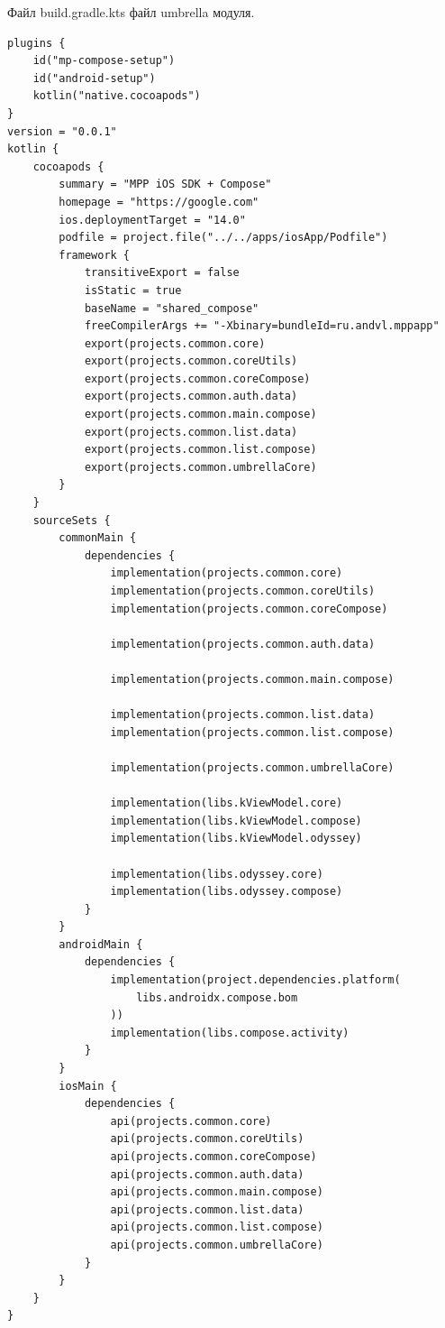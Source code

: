\documentclass[14pt, russian]{scrartcl}
\newenvironment{longlisting}{\captionsetup{type=listing}}{}
\begin{document}
\vspace{-20pt}

\begin{longlisting}
\caption{Файл build.gradle.kts файл umbrella модуля.}
\label{lst:umbrella-build-gradle}
\begin{verbatim}
plugins {
    id("mp-compose-setup")
    id("android-setup")
    kotlin("native.cocoapods")
}
version = "0.0.1"
kotlin {
    cocoapods {
        summary = "MPP iOS SDK + Compose"
        homepage = "https://google.com"
        ios.deploymentTarget = "14.0"
        podfile = project.file("../../apps/iosApp/Podfile")
        framework {
            transitiveExport = false
            isStatic = true
            baseName = "shared_compose"
            freeCompilerArgs += "-Xbinary=bundleId=ru.andvl.mppapp"
            export(projects.common.core)
            export(projects.common.coreUtils)
            export(projects.common.coreCompose)
            export(projects.common.auth.data)
            export(projects.common.main.compose)
            export(projects.common.list.data)
            export(projects.common.list.compose)
            export(projects.common.umbrellaCore)
        }
    }
    sourceSets {
        commonMain {
            dependencies {
                implementation(projects.common.core)
                implementation(projects.common.coreUtils)
                implementation(projects.common.coreCompose)

                implementation(projects.common.auth.data)

                implementation(projects.common.main.compose)

                implementation(projects.common.list.data)
                implementation(projects.common.list.compose)

                implementation(projects.common.umbrellaCore)

                implementation(libs.kViewModel.core)
                implementation(libs.kViewModel.compose)
                implementation(libs.kViewModel.odyssey)

                implementation(libs.odyssey.core)
                implementation(libs.odyssey.compose)
            }
        }
        androidMain {
            dependencies {
                implementation(project.dependencies.platform(
                    libs.androidx.compose.bom
                ))
                implementation(libs.compose.activity)
            }
        }
        iosMain {
            dependencies {
                api(projects.common.core)
                api(projects.common.coreUtils)
                api(projects.common.coreCompose)
                api(projects.common.auth.data)
                api(projects.common.main.compose)
                api(projects.common.list.data)
                api(projects.common.list.compose)
                api(projects.common.umbrellaCore)
            }
        }
    }
}
\end{verbatim}
\end{longlisting}
\end{document}
